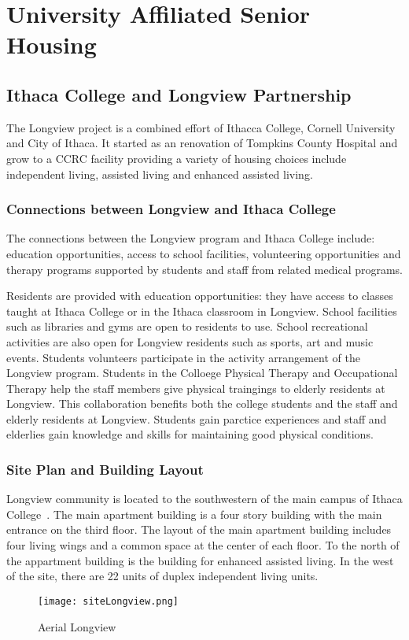 \section{University Affiliated Senior Housing}
\subsection{Ithaca College and Longview Partnership}
The Longview project is a combined effort of Ithacca College, Cornell
University and City of Ithaca. It started as an renovation of Tompkins
County Hospital and grow to a CCRC facility providing a variety of
housing choices include independent living, assisted living and
enhanced assisted living.

\subsubsection{Connections between Longview and Ithaca College}
The connections between the Longview program and Ithaca College
include: education opportunities, access to school facilities,
volunteering opportunities and therapy programs supported by students
and staff from related medical programs.

Residents are provided with education opportunities: they have access
to classes taught at Ithaca College or in the Ithaca classroom in
Longview. School facilities such as libraries and gyms are open to
residents to use. School recreational activities are also open for
Longview residents such as sports, art and music events. Students
volunteers participate in the activity arrangement of the Longview
program. Students in the Colloege Physical Therapy and Occupational
Therapy help the staff members give physical traingings to elderly
residents at Longview. This collaboration benefits both the college
students and the staff and elderly residents at Longview. Students
gain parctice experiences and staff and elderlies gain knowledge and
skills for maintaining good physical conditions.

\subsubsection{Site Plan and Building Layout}
Longview community is located to the southwestern of the main campus
of Ithaca College~\cite{googleMapLongiew}. The main apartment building
is a four story building with the main entrance on the third
floor. The layout of the main apartment building includes four living
wings and a common space at the center of each floor. To the north of
the appartment building is the building for enhanced assisted
living. In the west of the site, there are 22 units of duplex
independent living units.
\begin{figure}[htbp]
  \centering
  \texttt{[image: siteLongview.png]}
  \caption[Aerial View of Longview and Ithaca College]{Aerial Longview~\cite{googleMapLongiew}}
  \label{fig:siteLongview}
\end{figure}

